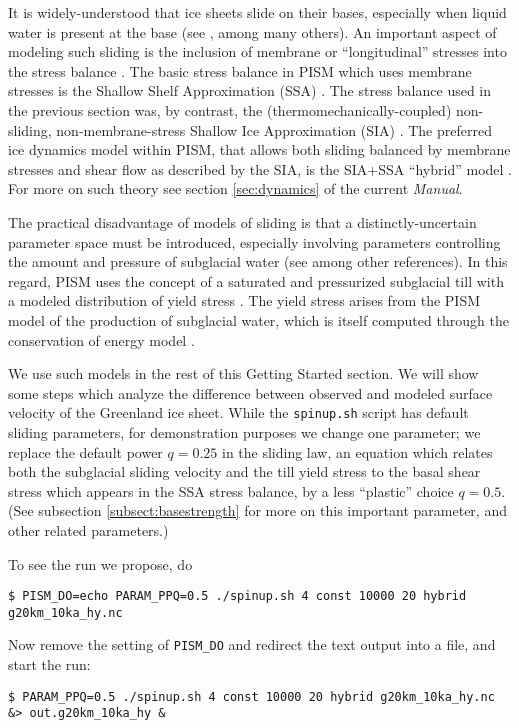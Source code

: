 It is widely-understood that ice sheets slide on their bases, especially when liquid water is present at the base (see \cite{Joughinetal2001,MacAyeal}, among many others).  An important aspect of modeling such sliding is the inclusion of membrane or ``longitudinal'' stresses into the stress balance \cite{BBssasliding}.  The basic stress balance in PISM which uses membrane stresses is the Shallow Shelf Approximation (SSA) \cite{WeisGreveHutter}.  The stress balance used in the previous section was, by contrast, the (thermomechanically-coupled) non-sliding, non-membrane-stress Shallow Ice Approximation (SIA) \cite{BBL,EISMINT00}.  The preferred ice dynamics model within PISM, that allows both sliding balanced by membrane stresses and shear flow as described by the SIA, is the SIA+SSA ``hybrid'' model \cite{BBssasliding,Winkelmannetal2011}.  For more on such theory see section \ref{sec:dynamics} of the current \emph{Manual}.

The practical disadvantage of models of sliding is that a distinctly-uncertain parameter space must be introduced, especially involving parameters controlling the amount and pressure of subglacial water (see \cite{AschwandenAdalgeirsdottirKhroulev,Clarke05,Tulaczyketal2000,vanPeltOerlemans2012} among other references).  In this regard, PISM uses the concept of a saturated and pressurized subglacial till with a modeled distribution of yield stress  \cite{BBssasliding,SchoofStream}.  The yield stress arises from the PISM model of the production of subglacial water, which is itself computed through the conservation of energy model \cite{AschwandenBuelerKhroulevBlatter}.

We use such models in the rest of this Getting Started section.  We will show some steps which analyze the difference between observed and modeled surface velocity of the Greenland ice sheet.  While the \texttt{spinup.sh} script has default sliding parameters, for demonstration purposes we change one parameter; we replace the default power $q=0.25$ in the sliding law, an equation which relates both the subglacial sliding velocity and the till yield stress to the basal shear stress which appears in the SSA stress balance, by a less ``plastic'' choice $q=0.5$.  (See subsection \ref{subsect:basestrength} for more on this important parameter, and other related parameters.)

To see the run we propose, do
\begin{verbatim}
$ PISM_DO=echo PARAM_PPQ=0.5 ./spinup.sh 4 const 10000 20 hybrid g20km_10ka_hy.nc
\end{verbatim}
Now remove the setting of \texttt{PISM_DO} and redirect the text output into a file, and start the run:
\begin{verbatim}
$ PARAM_PPQ=0.5 ./spinup.sh 4 const 10000 20 hybrid g20km_10ka_hy.nc &> out.g20km_10ka_hy &
\end{verbatim}

